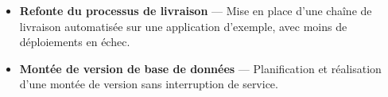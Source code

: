 
\begin{itemize}

\item \textbf{Refonte du processus de livraison} --- Mise en place d'une chaîne de livraison automatisée sur une application d'exemple, avec moins de déploiements en échec.

\item \textbf{Montée de version de base de données} --- Planification et réalisation d'une montée de version sans interruption de service.

\end{itemize}
